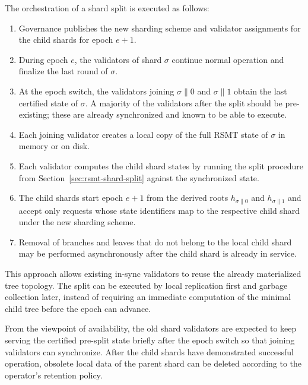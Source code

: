 The orchestration of a shard split is executed as follows:
\begin{enumerate}
	\item Governance publishes the new sharding scheme and validator assignments for the child shards for epoch $e+1$.
	\item During epoch $e$, the validators of shard $\sigma$ continue normal operation and finalize the last round of $\sigma$.
	\item At the epoch switch, the validators joining $\sigma\|0$ and $\sigma\|1$ obtain the last certified state of $\sigma$. A majority of the validators after the split should be pre-existing; these are already synchronized and known to be able to execute.
	\item Each joining validator creates a local copy of the full RSMT state of $\sigma$ in memory or on disk.
	\item Each validator computes the child shard states by running the split procedure from Section~\ref{sec:rsmt-shard-split} against the synchronized state.
	\item The child shards start epoch $e+1$ from the derived roots $h_{\sigma\|0}$ and $h_{\sigma\|1}$ and accept only requests whose state identifiers map to the respective child shard under the new sharding scheme.
	\item Removal of branches and leaves that do not belong to the local child shard may be performed asynchronously after the child shard is already in service.
\end{enumerate}

This approach allows existing in-sync validators to reuse the already materialized tree topology. The split can be executed by local replication first and garbage collection later, instead of requiring an immediate computation of the minimal child tree before the epoch can advance.

From the viewpoint of availability, the old shard validators are expected to keep serving the certified pre-split state briefly after the epoch switch so that joining validators can synchronize. After the child shards have demonstrated successful operation, obsolete local data of the parent shard can be deleted according to the operator's retention policy.
